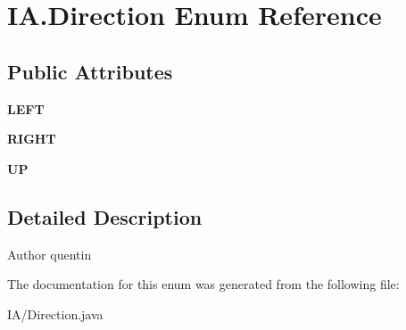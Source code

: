 \hypertarget{enum_i_a_1_1_direction}{}\section{I\+A.\+Direction Enum Reference}
\label{enum_i_a_1_1_direction}
\subsection*{Public Attributes}
\begin{DoxyCompactItemize}
\item 
\hypertarget{enum_i_a_1_1_direction_a4b8fa637cb73943c3622ff1e533e20bd}{}\label{enum_i_a_1_1_direction_a4b8fa637cb73943c3622ff1e533e20bd} 
{\bfseries L\+E\+FT}
\item 
\hypertarget{enum_i_a_1_1_direction_a708c98aed0edef7cfe31b4aff0d527fe}{}\label{enum_i_a_1_1_direction_a708c98aed0edef7cfe31b4aff0d527fe} 
{\bfseries R\+I\+G\+HT}
\item 
\hypertarget{enum_i_a_1_1_direction_a2dfd287aba6abd714fd190e0517ff85e}{}\label{enum_i_a_1_1_direction_a2dfd287aba6abd714fd190e0517ff85e} 
{\bfseries UP}
\end{DoxyCompactItemize}


\subsection{Detailed Description}
\begin{DoxyAuthor}{Author}
quentin 
\end{DoxyAuthor}


The documentation for this enum was generated from the following file\+:\begin{DoxyCompactItemize}
\item 
I\+A/Direction.\+java\end{DoxyCompactItemize}
